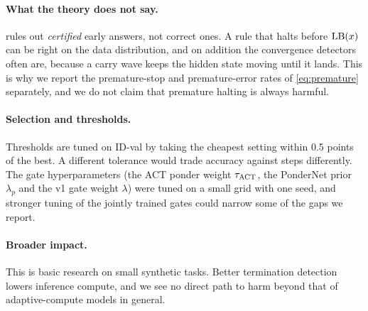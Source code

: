 \paragraph{What the theory does not say.}  rules out \emph{certified} early answers, not
correct ones. A rule that halts before $\operatorname{LB}(x)$ can be right on the data distribution, and on addition
the convergence detectors often are, because a carry wave keeps the hidden state moving until it lands.
This is why we report the premature-stop and premature-error rates of \cref{eq:premature} separately,
and we do not claim that premature halting is always harmful.

\paragraph{Selection and thresholds.} Thresholds are tuned on ID-val by taking the cheapest setting
within 0.5 points of the best. A different tolerance would trade accuracy against steps differently.
The gate hyperparameters (the ACT ponder weight $\tau_{\mathrm{ACT}}$, the PonderNet prior $\lambda_p$ and the v1 gate
weight $\lambda$) were tuned on a small grid with one seed, and stronger tuning of the jointly trained
gates could narrow some of the gaps we report.

\paragraph{Broader impact.} This is basic research on small synthetic tasks. Better termination
detection lowers inference compute, and we see no direct path to harm beyond that of adaptive-compute
models in general.
